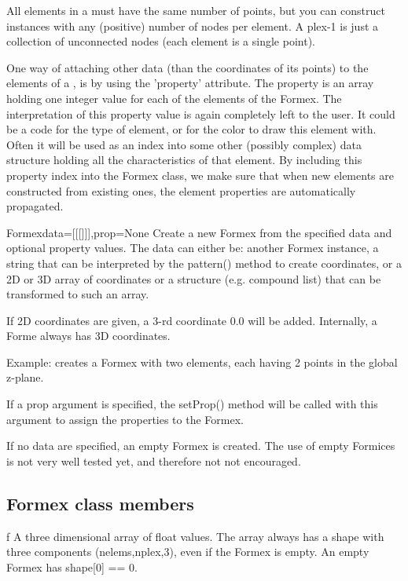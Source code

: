 {{All elements in a  must have the same number of points, but you can construct  instances with any (positive) number of nodes per element. A plex-1  is just a collection of unconnected nodes (each element is a single point).

One way of attaching other data (than the coordinates of its points) to the elements of a , is by using the 'property' attribute. The property is an array holding one integer value for each of the elements of the Formex. The interpretation of this property value is again completely left to the user. It could be a code for the type of element, or for the color to draw this element with. Often it will be used as an index into some other (possibly complex) data structure holding all the characteristics of that element. 
By including this property index into the Formex class, we make sure that when new elements are constructed from existing ones, the element properties are automatically propagated.


\begin{classdesc}{Formex}{data=[[[]]],prop=None}
Create a new Formex from the specified data and optional property values.
The data can either be: another Formex instance, a string that can be 
interpreted by the pattern() method to create coordinates, or a 2D or 3D array
of coordinates or a structure (e.g. compound list) that can be transformed to
such an array.
 
If 2D coordinates are given, a 3-rd coordinate 0.0 will be added.
Internally, a Forme always has 3D coordinates.
      
Example: 
creates a Formex with two elements, each having 2 points in the global z-plane.

If a prop argument is specified, the setProp() method will be called with this
argument to assign the properties to the Formex.

If no data are specified, an empty Formex is created. The use of empty Formices
is not very well tested yet, and therefore not not encouraged.
\end{classdesc}

\subsection{Formex class members}

\begin{memberdesc}  [array]{f}
A three dimensional array of float values. The array always has a shape with three components (nelems,nplex,3), even if the Formex is empty. An empty Formex has shape[0] == 0.
\end{memberdesc}

}}
